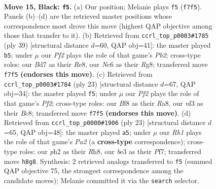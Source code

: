 \documentclass[11pt]{article}
\begin{document}
\clearpage

\begin{figure}[p]\centering
\begin{subfigure}{0.46\textwidth}\centering
\resizebox{\linewidth}{!}{%
\newchessgame
\chessboard[
  setfen={1r2kb1r/1p1b1ppp/p1n1p3/4P3/n7/4BNP1/PPK2P1P/RN3BR1 b k - 7 15},
  showmover=false,
  pgfstyle=straightmove, color=movearrow, markmove={f7-f5}
]}
\caption{}
\end{subfigure}\hfill
\begin{subfigure}{0.46\textwidth}\centering
\resizebox{\linewidth}{!}{%
\newchessgame
\chessboard[
  setfen={2k1r1r1/pppbb2p/2np1p1B/8/3P2PP/2P1N3/PP1K1N1R/R7 b - - 0 20},
  showmover=false,
  pgfstyle=straightmove, color=movearrow, markmove={b7-b5}
]}
\caption{}
\end{subfigure}
\\[4pt]
\begin{subfigure}{0.46\textwidth}\centering
\resizebox{\linewidth}{!}{%
\newchessgame
\chessboard[
  setfen={r1bnk1nr/ppp1bp1p/3p4/8/3P1B1P/2P5/PP3NP1/RN2KB1R b KQkq - 0 12},
  showmover=false,
  pgfstyle=straightmove, color=movearrow, markmove={f7-f5}
]}
\caption{}
\end{subfigure}\hfill
\begin{subfigure}{0.46\textwidth}\centering
\resizebox{\linewidth}{!}{%
\newchessgame
\chessboard[
  setfen={r1b1kb1r/p1p2ppp/1p6/3Pp3/1n2P3/4BP2/PP1K2PP/R4BNR b kq - 1 12},
  showmover=false,
  pgfstyle=straightmove, color=movearrow, markmove={a7-a5}
]}
\caption{}
\end{subfigure}
\caption{\textbf{Move 15, Black: \texttt{f5}.} (a) Our position; Melanie plays \texttt{f5} (\texttt{f7f5}). Panels (b)--(d) are the retrieved master positions whose correspondence most drove this move (highest QAP objective among those that transfer to it). (b) Retrieved from \texttt{ccrl\_top\_p0003\#1785} (ply 39) [structural distance $d$=60, QAP obj=41]: the master played \texttt{b5}; under $\mu$ our \emph{Pf2} plays the role of that game's \emph{Pb2}; cross-type roles: our \emph{B}d7 as their \emph{R}e8, our \emph{N}c6 as their \emph{R}g8; transferred move \texttt{f7f5} \textbf{(endorses this move)}. (c) Retrieved from \texttt{ccrl\_top\_p0003\#1784} (ply 23) [structural distance $d$=67, QAP obj=34]: the master played \texttt{f5}; under $\mu$ our \emph{Pf2} plays the role of that game's \emph{Pf2}; cross-type roles: our \emph{B}f8 as their \emph{R}a8, our \emph{n}f3 as their \emph{B}c8; transferred move \texttt{f7f5} \textbf{(endorses this move)}. (d) Retrieved from \texttt{ccrl\_top\_p0000\#1906} (ply 23) [structural distance $d$=65, QAP obj=48]: the master played \texttt{a5}; under $\mu$ our \emph{Rh1} plays the role of that game's \emph{Pa2} (a \textbf{cross-type} correspondence); cross-type roles: our \emph{p}h2 as their \emph{R}h8, our \emph{b}e3 as their \emph{P}f7; transferred move \texttt{h8g8}. Synthesis: 2 retrieved analogs transferred to \texttt{f5} (summed QAP objective 75, the strongest correspondence among the candidate moves); Melanie committed it via the \texttt{search} selector.}
\label{fig:thought-m29}
\end{figure}
\end{document}
